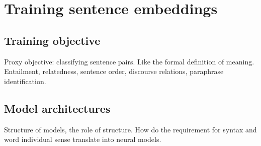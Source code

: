 \setchapterpreamble[u]{\margintoc}
\chapter{Training sentence embeddings}

\section{Training objective}

Proxy objective: classifying sentence pairs. Like the formal definition of meaning. Entailment, relatedness, sentence order, discourse relations, paraphrase identification. 

\section{Model architectures}

Structure of models, the role of structure. How do the requirement for syntax and word individual sense translate into neural models.